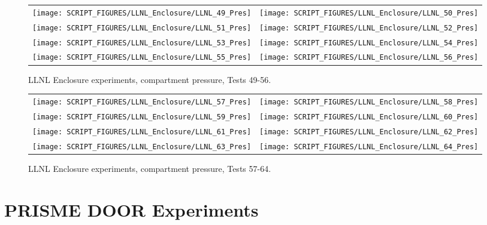 \begin{figure}[p]
\begin{tabular*}{\textwidth}{l@{\extracolsep{\fill}}r}
\texttt{[image: SCRIPT\_FIGURES/LLNL\_Enclosure/LLNL\_49\_Pres]} &
\texttt{[image: SCRIPT\_FIGURES/LLNL\_Enclosure/LLNL\_50\_Pres]} \\
\texttt{[image: SCRIPT\_FIGURES/LLNL\_Enclosure/LLNL\_51\_Pres]} &
\texttt{[image: SCRIPT\_FIGURES/LLNL\_Enclosure/LLNL\_52\_Pres]} \\
\texttt{[image: SCRIPT\_FIGURES/LLNL\_Enclosure/LLNL\_53\_Pres]} &
\texttt{[image: SCRIPT\_FIGURES/LLNL\_Enclosure/LLNL\_54\_Pres]} \\
\texttt{[image: SCRIPT\_FIGURES/LLNL\_Enclosure/LLNL\_55\_Pres]} &
\texttt{[image: SCRIPT\_FIGURES/LLNL\_Enclosure/LLNL\_56\_Pres]}
\end{tabular*}
\caption[LLNL Enclosure experiments, compartment pressure, Tests 49-56]{LLNL Enclosure experiments, compartment pressure, Tests 49-56.}
\label{LLNL_Enclosure_Pres_7}
\end{figure}

\begin{figure}[p]
\begin{tabular*}{\textwidth}{l@{\extracolsep{\fill}}r}
\texttt{[image: SCRIPT\_FIGURES/LLNL\_Enclosure/LLNL\_57\_Pres]} &
\texttt{[image: SCRIPT\_FIGURES/LLNL\_Enclosure/LLNL\_58\_Pres]} \\
\texttt{[image: SCRIPT\_FIGURES/LLNL\_Enclosure/LLNL\_59\_Pres]} &
\texttt{[image: SCRIPT\_FIGURES/LLNL\_Enclosure/LLNL\_60\_Pres]} \\
\texttt{[image: SCRIPT\_FIGURES/LLNL\_Enclosure/LLNL\_61\_Pres]} &
\texttt{[image: SCRIPT\_FIGURES/LLNL\_Enclosure/LLNL\_62\_Pres]} \\
\texttt{[image: SCRIPT\_FIGURES/LLNL\_Enclosure/LLNL\_63\_Pres]} &
\texttt{[image: SCRIPT\_FIGURES/LLNL\_Enclosure/LLNL\_64\_Pres]}
\end{tabular*}
\caption[LLNL Enclosure experiments, compartment pressure, Tests 57-64]{LLNL Enclosure experiments, compartment pressure, Tests 57-64.}
\label{LLNL_Enclosure_Pres_8}
\end{figure}



\clearpage

\section{PRISME DOOR Experiments}

